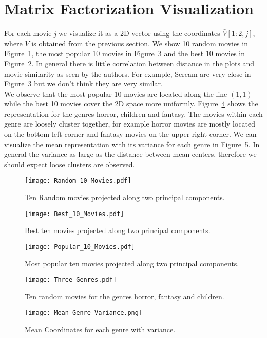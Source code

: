 \section{Matrix Factorization Visualization}

For each movie \textit{j} we visualize it as a 2D vector using the coordinates $\bar{V}[1:2,j]$, where $\bar{V}$ is obtained from the previous section. We show 10 random movies in Figure~\ref{fig:tenRandom}, the most popular 10 movies in Figure~\ref{fig:tenMostPopular} and the best 10 movies in Figure~\ref{fig:tenBest}. In general there is little correlation between distance in the plots and movie similarity as seen by the authors. For example, Scream are very close in Figure~\ref{fig:tenMostPopular} but we don't think they are very similar.\\
We observe that the most popular 10 movies are located along the line $(1,1)$ while the best 10 movies cover the 2D space more uniformly.
Figure~\ref{fig:tg} shows the representation for the genres horror, children and fantasy. The movies within each genre are loosely cluster together, for example horror movies are mostly located on the bottom left corner and fantasy movies on the upper right corner. We can visualize the mean representation with its variance for each genre in Figure~\ref{fig:tgMV}. In general the variance as large as the distance between mean centers, therefore we should expect loose clusters are observed. 

\begin{figure}[hptb]
\centering
\texttt{[image: Random\_10\_Movies.pdf]}
 \caption{Ten Random movies projected along two principal components.}
\label{fig:tenRandom}
\end{figure}


\begin{figure}[hptb]
\centering
\texttt{[image: Best\_10\_Movies.pdf]}
 \caption{Best ten movies projected along two principal components.}
\label{fig:tenBest}
\end{figure}


\begin{figure}[hptb]
\centering
\texttt{[image: Popular\_10\_Movies.pdf]}
 \caption{Most popular ten movies projected along two principal components.}
\label{fig:tenMostPopular}
\end{figure}


\begin{figure}[hptb]
\centering
\texttt{[image: Three\_Genres.pdf]}
 \caption{Ten random movies for the genres horror, fantasy and children. }
\label{fig:tg}
\end{figure}


\begin{figure}[hptb]
\centering
\texttt{[image: Mean\_Genre\_Variance.png]}
 \caption{Mean Coordinates for each genre with variance.}
\label{fig:tgMV}
\end{figure}
